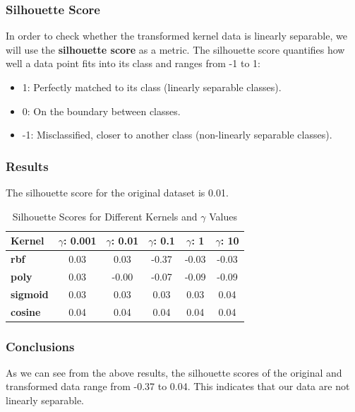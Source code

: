 \documentclass{beamer}
\begin{document}
\begin{frame}
\frametitle{Silhouette Score}
In order to check whether the transformed kernel data is linearly separable, we will use the \textbf{silhouette score} as a metric. 
The silhouette score quantifies how well a data point fits into its class and ranges from -1 to 1:
\begin{itemize}
    \item  1: Perfectly matched to its class (linearly separable classes).
    \item  0: On the boundary between classes.
    \item -1: Misclassified, closer to another class (non-linearly separable classes).
\end{itemize}
\end{frame}

\begin{frame}
\frametitle{Results}
The silhouette score for the original dataset is 0.01.
\vspace{0.5cm}
\begin{table}[ht]
\centering
\begin{adjustbox}{max width=\textwidth}
\begin{tabular}{@{}lccccc@{}}
\toprule
\textbf{Kernel} & \textbf{$\gamma$: 0.001} & \textbf{$\gamma$: 0.01} & \textbf{$\gamma$: 0.1} & \textbf{$\gamma$: 1} & \textbf{$\gamma$: 10} \\ \midrule
\textbf{rbf}     & 0.03                 & 0.03                & -0.37              & -0.03            & -0.03            \\
\textbf{poly}    & 0.03                 & -0.00               & -0.07              & -0.09            & -0.09            \\
\textbf{sigmoid} & 0.03                 & 0.03                & 0.03               & 0.03             & 0.04             \\
\textbf{cosine}  & 0.04                 & 0.04                & 0.04               & 0.04             & 0.04             \\ \bottomrule
\end{tabular}
\end{adjustbox}
\caption{Silhouette Scores for Different Kernels and $\gamma$ Values}
\label{tab:silhouette_scores}
\end{table}
\end{frame}

\begin{frame}
\frametitle{Conclusions}
As we can see from the above results, the silhouette scores of the original and transformed data range from -0.37 to 0.04. This indicates that our data are not linearly separable.
\end{frame}
\end{document}
